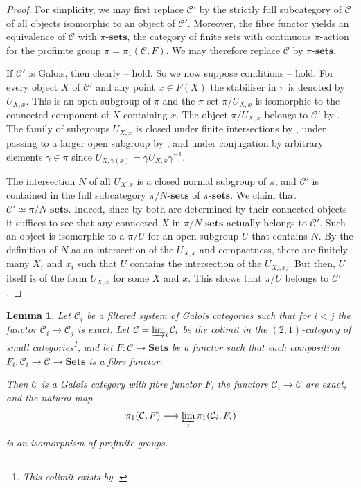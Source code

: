 \documentclass[a4paper,twoside,11pt,reqno]{amsart}
\newcommand{\cC}{{\mathcal C}}
\newcommand{\cat}[1]{\mathbf{#1}}
\newcommand{\sets}{\cat{sets}} %
\newcommand{\Sets}{\cat{Sets}}
\newtheorem{lem}[thm]{Lemma}
\theoremstyle{definition}
\numberwithin{equation}{subsection}
\begin{document}
\begin{proof}
    For simplicity, we may first replace $\cC'$ by the strictly full subcategory of $\cC$ of all objects isomorphic to an object of $\cC'$. Moreover, the fibre functor yields an equivalence of $\cC$ with $\pi\text{-}\sets$, the category of finite sets with continuous $\pi$-action for the profinite group $\pi = \pi_1(\cC,F)$. We may therefore replace $\cC$ by $\pi\text{-}\sets$. 

    If $\cC'$ is Galois, then clearly 
    -- hold. So we now suppose conditions -- hold. 
    For every object $X$ of $\cC'$ and any point $x \in F(X)$ the stabiliser in $\pi$ is denoted by $U_{X,x}$. This is an open subgroup of $\pi$ and the $\pi$-set $\pi/U_{X,x}$ is isomorphic to the connected component of $X$ containing $x$. The object $\pi/U_{X,x}$ belongs to $\cC'$ by 
    . The family of subgroups $U_{X,x}$ is closed under finite intersections by , 
    under passing to a larger open subgroup by , and under conjugation by arbitrary elements $\gamma \in \pi$ since $U_{X,\gamma(x)} = \gamma U_{X,x} \gamma^{-1}$.

    The intersection $N$ of all $U_{X,x}$ is a closed normal subgroup of $\pi$, and $\cC'$ is contained in the full subcategory $\pi/N\text{-}\sets$ of $\pi\text{-}\sets$. We claim that $\cC' \simeq \pi/N\text{-}\sets$. Indeed, since by  both are determined by their connected objects it suffices to see that any connected $X$ in $\pi/N\text{-}\sets$ actually belongs to $\cC'$. Such an object is isomorphic to a $\pi/U$ for an open subgroup $U$ that contains $N$. By the definition of $N$ as an intersection of the $U_{X,x}$ and compactness, there are finitely many $X_i$ and $x_i$ such that $U$ contains the intersection of the $U_{X_i,x_i}$. But then, $U$ itself is of the form $U_{X,x}$ for some $X$ and $x$. This shows that $\pi/U$  belongs to $\cC'$.
\end{proof}

\begin{lem}
\label{lem:filtered colimits of Galois categories}
   Let $\cC_i$ be a filtered system of Galois categories such that for $i < j$ the functor $\cC_i \to \cC_j$ is exact. Let $\cC = \varinjlim_i \cC_i$ be the colimit in the $(2,1)$-category of small categories\footnote{This colimit exists by  \cite[3.74]{Kelly:EnrichedCats}.}, and let $F\colon \cC \to \Sets$ be a functor such that each composition $F_i\colon \cC_i \to \cC \to \Sets$ is a fibre functor. 
   
   Then $\cC$ is a Galois category with fibre functor $F$, the functors $\cC_i \to \cC$ are exact, and the natural map 
   \[
   \pi_1(\cC,F) \longrightarrow \varprojlim_i \pi_1(\cC_i, F_i)
   \]
   is an isomorphism of profinite groups.
\end{lem}
\end{document}
